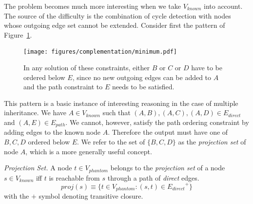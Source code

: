 

The problem becomes much more interesting when we take $V_{known}$
into account. The source of the difficulty is the combination of cycle
detection with nodes whose outgoing edge set cannot be extended.
Consider first the pattern of Figure~\ref{fig:choice}.

\begin{figure}[htp]
  \centering \texttt{[image: figures/complementation/minimum.pdf]}
  \caption[Multiple Inheritance Constraint]{In any solution of these
    constraints, either $B$ or $C$ or $D$ have to be ordered below
    $E$, since no new outgoing edges can be added to $A$ and the path
    constraint to $E$ needs to be satisfied.}
\label{fig:choice}
\end{figure}

This pattern is a basic instance of interesting reasoning in the case of
multiple inheritance. We have $A \in V_{known}$ such that $(A,B),
(A,C), (A,D) \in E_{direct}$ and $(A,E) \in E_{path}$. We cannot,
however, satisfy the path ordering constraint by adding edges to the
known node $A$. Therefore the output must have one of $B,C,D$ ordered
below $E$. We refer to the set of $\{B,C,D\}$ as the \emph{projection
  set} of node $A$, which is a more generally useful concept.

\begin{defn}{\emph{Projection Set.}}
  A node $t \in V_{phantom}$ belongs to the \emph{projection set} of a
  node $s \in V_{known}$ iff $t$ is reachable from $s$ through a path
  of \emph{direct} edges.
 $$ \textit{proj}(s) \equiv \{t \in V_{phantom}: (s,t) \in {E_{direct}}^+\}$$
 with the $+$ symbol denoting transitive closure.
\end{defn}

